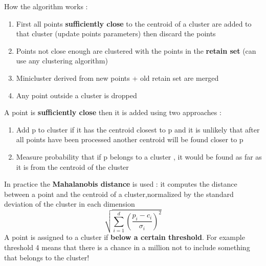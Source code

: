 How the algorithm works :
\begin{enumerate}
\item First all points \textbf{sufficiently close} to the centroid of a cluster are added to that cluster (update points parameters) then discard the points

\item Points not close enough are clustered with the points in the \textbf{retain set} (can use any clustering algorithm)
\item Minicluster derived from new points + old retain set are merged
\item Any point outside a cluster is dropped 
\end{enumerate}
A point is \textbf{sufficiently close} then it is added using two approaches :
\begin{enumerate}
\item  Add p to cluster if it has the centroid closest to p and it is unlikely that after all points have been processed another centroid will be found closer to p
\item Measure probability that if p belongs to a cluster , it would be found as far as it is from the centroid of the cluster
\end{enumerate}
In practice the 	\textbf{Mahalanobis distance} is used :
it computes the distance between a point and the centroid of a cluster,normalized by the standard deviation of the cluster in each dimension
$$ \sqrt{\sum \limits_{i=1}^{d} \left( \frac{p_i-c_i}{\sigma_i} \right)^2}$$
A point is assigned to a cluster if \textbf{below a certain threshold}. For example threshold 4 means that there is a chance in a million not to include something that belongs to the cluster!\\

